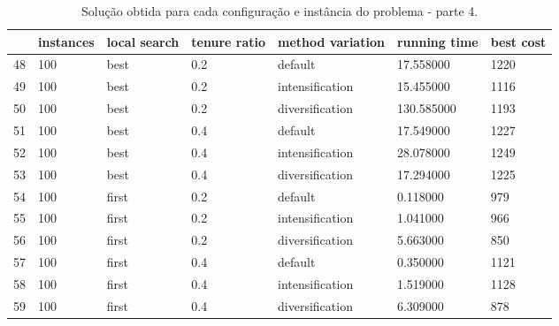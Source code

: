 \begin{landscape}
\begin{table}
\centering
\begin{tabular}{lllllll}
\toprule
{} & instances & local search & tenure ratio & method variation & running time & best cost \\
\midrule
48 &       100 &         best &          0.2 &          default &    17.558000 &      1220 \\
49 &       100 &         best &          0.2 &  intensification &    15.455000 &      1116 \\
50 &       100 &         best &          0.2 &  diversification &   130.585000 &      1193 \\
51 &       100 &         best &          0.4 &          default &    17.549000 &      1227 \\
52 &       100 &         best &          0.4 &  intensification &    28.078000 &      1249 \\
53 &       100 &         best &          0.4 &  diversification &    17.294000 &      1225 \\
54 &       100 &        first &          0.2 &          default &     0.118000 &       979 \\
55 &       100 &        first &          0.2 &  intensification &     1.041000 &       966 \\
56 &       100 &        first &          0.2 &  diversification &     5.663000 &       850 \\
57 &       100 &        first &          0.4 &          default &     0.350000 &      1121 \\
58 &       100 &        first &          0.4 &  intensification &     1.519000 &      1128 \\
59 &       100 &        first &          0.4 &  diversification &     6.309000 &       878 \\
\bottomrule
\end{tabular}
\caption{Solução obtida para cada configuração e instância do problema - parte 4.}
\label{table:all-data-4}
\end{table}


\end{landscape}
